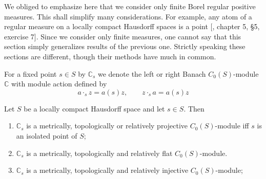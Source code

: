 We obliged to emphasize here that we consider only finite Borel regular positive
measures. This shall simplify many considerations. For example, any atom of a 
regular measure on a locally compact Hausdorff spaces is a point
[\cite{BourbElemMathIntegLivVI}, chapter 5, \S 5, exercise 7]. Since we consider
only finite measures, one cannot say that this section simply generalizes
results of the previous one. Strictly speaking these sections are different,
though their methods have much in common.

For a fixed point $s\in S$ by $\mathbb{C}_s$ we denote the left or right Banach
$C_0(S)$-module $\mathbb{C}$ with module action defined by
$$
a\cdot_s z=a(s)z,\qquad z\cdot_s a=a(s)z
$$
\begin{proposition}\label{OneDimC0SModMetTopRelProjIngFlat} Let $S$ be a locally
compact Hausdorff space and let $s\in S$. Then 

\begin{enumerate}[label = (\roman*)]
    \item $\mathbb{C}_s$ is a metrically, topologically or relatively projective 
    $C_0(S)$-module iff $s$ is an isolated point of $S$;

    \item $\mathbb{C}_s$ is a metrically, topologically and relatively flat 
    $C_0(S)$-module.

    \item $\mathbb{C}_s$ is a metrically, topologically and relatively injective 
    $C_0(S)$-module;

\end{enumerate}
\end{proposition}
